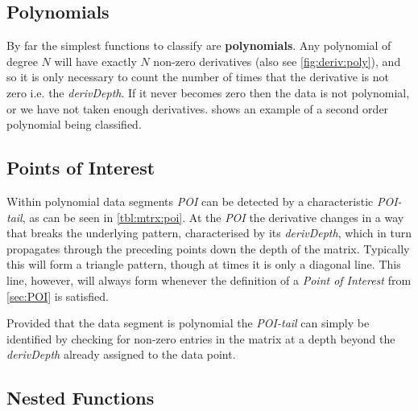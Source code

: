 \documentclass[main.tex]{subfiles}
\begin{document}
    \subsection{Polynomials}
    
      By far the simplest functions to classify are \textbf{polynomials}. Any polynomial of degree $N$ will have exactly $N$ non-zero derivatives (also see \cref{fig:deriv:poly}), and so it is only necessary to count the number of times that the derivative is not zero i.e. the \textit{derivDepth}. If it never becomes zero then the data is not polynomial, or we have not taken enough derivatives.  shows an example of a second order polynomial being classified.
      
    \subsection{Points of Interest}
      
      Within polynomial data segments \textit{POI} can be detected by a characteristic \textit{POI-tail}, as can be seen in \cref{tbl:mtrx:poi}. At the \textit{POI} the derivative changes in a way that breaks the underlying pattern, characterised by its \textit{derivDepth}, which in turn propagates through the preceding points down the depth of the matrix. Typically this will form a triangle pattern, though at times it is only a diagonal line. This line, however, will always form whenever the definition of a \textit{Point of Interest} from \cref{sec:POI} is satisfied.
      
          
      
      Provided that the data segment is polynomial the \textit{POI-tail} can simply be identified by checking for non-zero entries in the matrix at a depth beyond the \textit{derivDepth} already assigned to the data point. 
    
    \subsection{Nested Functions}
      \label{sec:con:nest}
      
\end{document}
